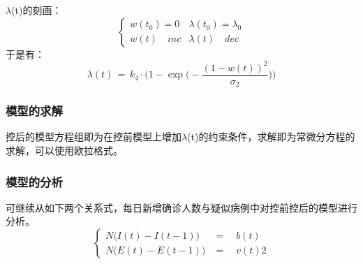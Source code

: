 $\lambda$(t)的刻画：
\begin{equation*}
\begin{cases}
w(t_0)=0 & \lambda(t_0)=\lambda_0 \\
w(t)\quad inc & \lambda(t)\quad dec
\end{cases}
\end{equation*}
于是有：
$$\lambda(t)\,=\,k_4\cdot\Bigg(1-\exp\Big(-\frac{(1-w(t))^2}{\sigma_2}\Big)\Bigg)$$

\subsubsection{模型的求解}
控后的模型方程组即为在控前模型上增加$\lambda$(t)的约束条件，求解即为常微分方程的求解，可以使用欧拉格式。

\subsubsection{模型的分析}
可继续从如下两个关系式，每日新增确诊人数与疑似病例中对控前控后的模型进行分析。
\begin{equation*}
\begin{cases}
N\Big(I(t)-I(t-1)\Big) &=\quad b(t) \\
N\Big(E(t)-E(t-1)\Big) &=\quad v(t)2
\end{cases}
\end{equation*}